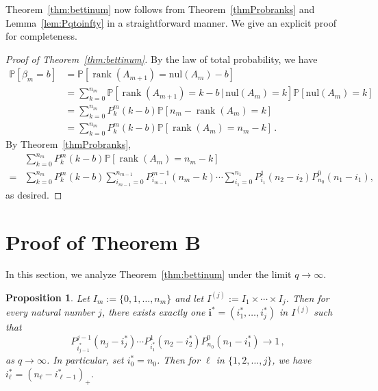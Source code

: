\documentclass[3p,times]{elsarticle}
\newtheorem{proposition}[theorem]{Proposition}
\theoremstyle{remark}
\DeclareMathOperator{\rank}{\mathrm{rank}}
\newcommand{\nul}{\mathrm{nul}}
\newcommand{\ra}{\rightarrow}
\newcommand{\st}{\,|\,} %
\begin{document}
Theorem~\ref{thm:bettinum} now follows from Theorem~\ref{thmProbranks} and 
Lemma~\ref{lem:Pqtoinfty} in a straightforward manner. We give an explicit proof
for completeness.

\begin{proof}[Proof of Theorem~\ref{thm:bettinum}]
  By the law of total probability, we have
  \begin{align*}
    \mathbb{P}[\beta_{m} = b] 
    &= \mathbb{P}[\rank(A_{m+1}) = \nul(A_{m}) - b]\\
    &= \sum_{k=0}^{n_{m}}\mathbb{P}[\rank(A_{m+1}) = k - b\st \nul(A_{m})=k] \mathbb{P}[\nul(A_{m}) = k]\\
    &= \sum_{k=0}^{n_{m}} P_{k}^{m}(k-b)\mathbb{P}[n_{m} - \rank(A_{m}) = k]\\
    &= \sum_{k=0}^{n_{m}} P_{k}^{m}(k-b)\mathbb{P}[\rank(A_{m}) = n_{m} - k] \, .
  \end{align*}
  By Theorem~\ref{thmProbranks},
  \begin{align*}
    & \sum_{k=0}^{n_{m}} P_{k}^{m}(k-b)\mathbb{P}[\rank(A_{m}) = n_{m} - k] \\
    =& \sum_{k=0}^{n_{m}} P_{k}^{m}(k-b)\sum_{i_{m-1}=0}^{n_{m-1}} P_{i_{m-1}}^{m-1}\left(n_{m} -k\right)
    \cdots
    \sum_{i_1 = 0}^{n_1} P_{i_1}^1\left(n_2 - i_2\right) P_{n_0}^0 \left(n_1 - i_1\right), 
  \end{align*}
  as desired.
\end{proof}



\section{Proof of Theorem B}
In this section, we analyze Theorem~\ref{thm:bettinum} under the 
limit $q \ra \infty$.

\begin{proposition}
  \label{prop:oneseq}
Let $I_m:= \{0,1,\ldots, n_m\}$ and let $I^{(j)}:= I_1\times\cdots \times I_j$.
Then for every natural number $j$, there exists exactly one $\mathbf{i}^\ast =
(i_1^\ast,\ldots, i_j^\ast)$ in $I^{(j)}$ such that 
\[
  P_{i_{j-1}^\ast}^{j-1}(n_j-i_j^\ast)\cdots
  P_{i_1^\ast}^1(n_2-i_2^\ast)P_{n_0}^0(n_1-i_1^\ast) \to 1 \, ,
\]
as $q\to\infty$. In particular, set $i_0^\ast = n_0$. Then for $\ell$ in
$\{1,2,\ldots, j\}$, we have $i_\ell^\ast = (n_\ell - i_{\ell - 1}^\ast)_+$.
\end{proposition}
\end{document}
